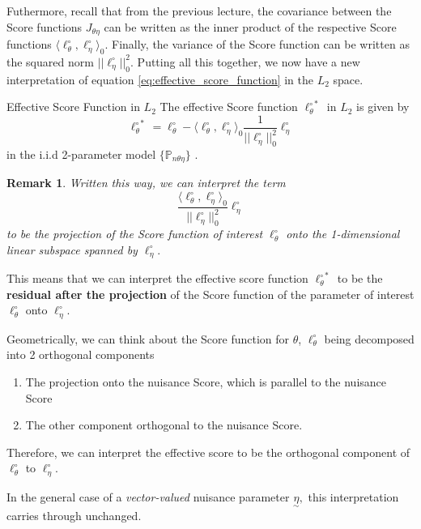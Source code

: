 \documentclass[twoside]{article}
\newtheorem{remark}[theorem]{Remark}
\newcommand{\prob}{\mathbb{P}}
\newcommand{\utilde}{\underset{\sim}}
\begin{document}
 Futhermore, recall that from the previous lecture, the covariance between the Score functions $J_{\theta \eta}$ can be written as the inner product of the respective Score functions $\langle \ell_{\theta}^{\circ}, \ell_{\eta}^{\circ}\rangle_0$. Finally, the variance of the Score function can be written as the squared norm $||\ell_{\eta}^{\circ}||_{0}^{2}$. Putting all this together, we now have a new interpretation of equation \ref{eq:effective_score_function} in the $L_2$ space. 

 \begin{proposition_exam}{Effective Score Function in $L_2$}{} The effective Score function $\ell_{\theta}^{\circ *}$ in $L_2$ is given by 
 \begin{equation}
  \ell_{\theta}^{\circ *} = \ell_{\theta}^{\circ} - \langle \ell_{\theta}^{\circ}, \ell_{\eta}^{\circ}\rangle_0 \frac{1}{||\ell_{\eta}^{\circ}||_{0}^{2}}\ell_{\eta}^{\circ}
 \end{equation}
 in the i.i.d 2-parameter model $\{\prob_{n \theta \eta}\}$ .
 \end{proposition_exam}

\begin{remark} Written this way, we can interpret the term 
$$
\frac{\langle \ell_{\theta}^{\circ}, \ell_{\eta}^{\circ}\rangle_0 }{||\ell_{\eta}^{\circ}||_{0}^{2}}\ell_{\eta}^{\circ}
$$
to be the projection of the Score function of interest $\ell_{\theta}^{\circ}$ onto the 1-dimensional linear subspace spanned by $\ell_{\eta}^{\circ}.$
\end{remark}

This means that we can interpret the effective score function $\ell_{\theta}^{\circ *}$ to be the \textbf{residual after the projection} of the Score function of the parameter of interest  $\ell_{\theta}^{\circ}$ onto $\ell_{\eta}^{\circ}.$

Geometrically, we can think about the Score function for $\theta$, $\ell_{\theta}^{\circ}$ being decomposed into 2 orthogonal components 
\begin{enumerate}
  \item The projection onto the nuisance Score, which is parallel to the nuisance Score
  \item The other component orthogonal to the nuisance Score.
\end{enumerate}
Therefore, we can interpret the effective score to be the orthogonal component of $\ell_{\theta}^{\circ}$ to $\ell_{\eta}^{\circ}$.

In the general case of a \textit{vector-valued} nuisance parameter $\utilde{\eta},$ this interpretation carries through unchanged. 
\end{document}
